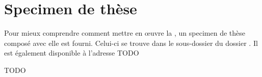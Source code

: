 \chapter{Specimen de thèse}\label{cha:specimen}

Pour mieux comprendre comment mettre en œuvre la \yatcl, un specimen de thèse
composé avec elle est fourni. Celui-ci se trouve dans le sous-dossier
 du dossier . Il est également
disponible à l'adresse TODO

TODO

%
\iffalse
\fi
